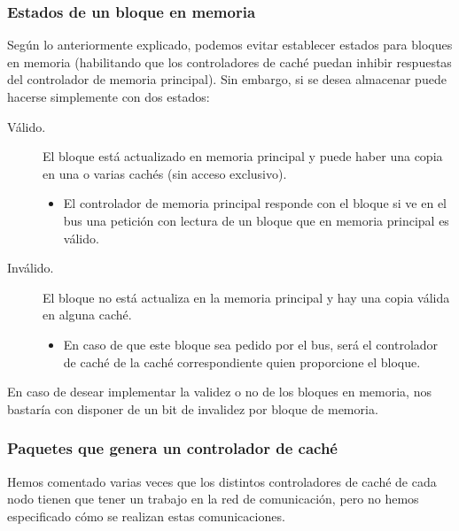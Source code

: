 \subsubsection{Estados de un bloque en memoria}
Según lo anteriormente explicado, podemos evitar establecer estados para bloques en memoria (habilitando que los controladores de caché puedan inhibir respuestas del controlador de memoria principal). Sin embargo, si se desea almacenar puede hacerse simplemente con dos estados:
\begin{description}
    \item [Válido.] El bloque está actualizado en memoria principal y puede haber una copia en una o varias cachés (sin acceso exclusivo). 

        \begin{itemize}
            \item El controlador de memoria principal responde con el bloque si ve en el bus una petición con lectura de un bloque que en memoria principal es válido.
        \end{itemize}
    \item [Inválido.] El bloque no está actualiza en la memoria principal y hay una copia válida en alguna caché.

        \begin{itemize}
            \item En caso de que este bloque sea pedido por el bus, será el controlador de caché de la caché correspondiente quien proporcione el bloque.
        \end{itemize}
\end{description}
En caso de desear implementar la validez o no de los bloques en memoria, nos bastaría con disponer de un bit de invalidez por bloque de memoria.

\subsubsection{Paquetes que genera un controlador de caché}
Hemos comentado varias veces que los distintos controladores de caché de cada nodo tienen que tener un trabajo en la red de comunicación, pero no hemos especificado cómo se realizan estas comunicaciones. 

